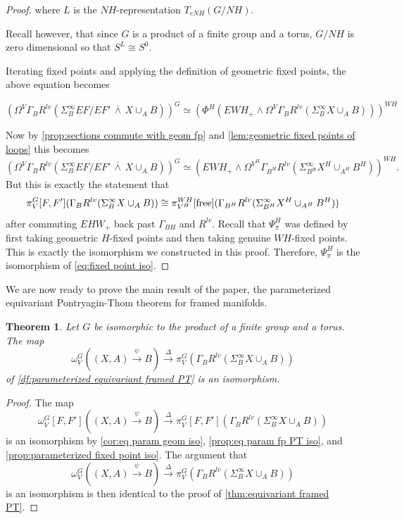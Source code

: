 \documentclass[11pt]{amsart}
\newcommand{\free}{\textup{free}}
\newcommand{\barsmash}{\,\overline\wedge\,}
\theoremstyle{plain}   %
\newtheorem{thm}{Theorem}[section] %
\theoremstyle{definition}
\theoremstyle{remark}
\numberwithin{equation}{section}
\begin{document}
\begin{proof}
where $L$ is the $NH$-representation $T_{eNH}(G/NH)$. 

Recall however, that since $G$ is a product of a finite group and a torus, $G/NH$ is zero dimensional so that $S^L\cong S^0$. 

Iterating fixed points and applying the definition of geometric fixed points, the above equation becomes

\[
(\Omega^V\Gamma_BR^{lv}(\Sigma_B^\infty EF/EF'\barsmash X\cup_A B))^G \simeq (\Phi^H(EWH_+\wedge\Omega^V\Gamma_BR^{lv}(\Sigma_B^\infty X\cup_A B)))^{WH}
\]

Now by \cref{prop:sections commute with geom fp} and \cref{lem:geometric fixed points of loops} this becomes
\[
(\Omega^V\Gamma_BR^{lv}(\Sigma_B^\infty EF/EF'\barsmash X\cup_A B))^G \simeq (EWH_+\wedge\Omega^{V^H}\Gamma_{B^H}R^{lv}(\Sigma_{B^H}^\infty X^H\cup_{A^H} B^H))^{WH}.
\]
But this is exactly the statement that 
\begin{equation}\label{eq:fixed point iso}
\pi_V^G[F,F'](\Gamma_BR^{lv}(\Sigma_B^\infty X\cup_A B))\cong \pi_{V^H}^{WH}[\free](\Gamma_{B^H}R^{lv}(\Sigma_{B^H}^\infty X^H\cup_{A^H} B^H))
\end{equation}
after commuting $EHW_+$ back past $\Gamma_{BH}$ and $R^{lv}$. Recall that $\Psi_\pi^H$ was defined by first taking geometric $H$-fixed points and then taking genuine $WH$-fixed points. This is exactly the isomorphism we constructed in this proof. Therefore, $\Psi_\pi^H$ is the isomorphism of \cref{eq:fixed point iso}. 
\end{proof}

We are now ready to prove the main result of the paper, the parameterized equivariant Pontryagin-Thom theorem for framed manifolds. 


\begin{thm}\label{thm:equivariant parameterized PT}
Let $G$ be isomorphic to the product of a finite group and a torus. The map
\[
\omega_{V}^G((X,A)\xrightarrow{\psi} B) \xrightarrow{\Delta} \pi_V^G\left( \Gamma_BR^{lv}(\Sigma_B^\infty X\cup_A B) \right)
\]
of \cref{df:parameterized equivariant framed PT} is an isomorphism.
\end{thm}
\begin{proof}
The map 
\[
\omega_{V}^G[F,F']((X,A)\xrightarrow{\psi} B) \xrightarrow{\Delta} \pi_V^G[F,F']\left( \Gamma_BR^{lv}(\Sigma_B^\infty X\cup_A B) \right)
\]
is an isomorphism by \cref{cor:eq param geom iso}, \cref{prop:eq param fp PT iso}, and \cref{prop:parameterized fixed point iso}. The argument that 
\[
\omega_{V}^G((X,A)\xrightarrow{\psi} B) \xrightarrow{\Delta} \pi_V^G\left(\Gamma_BR^{lv}(\Sigma_B^\infty X\cup_A B) \right)
\]
is an isomorphism is then identical to the proof of \cref{thm:equivariant framed PT}.
\end{proof}
\end{document}
